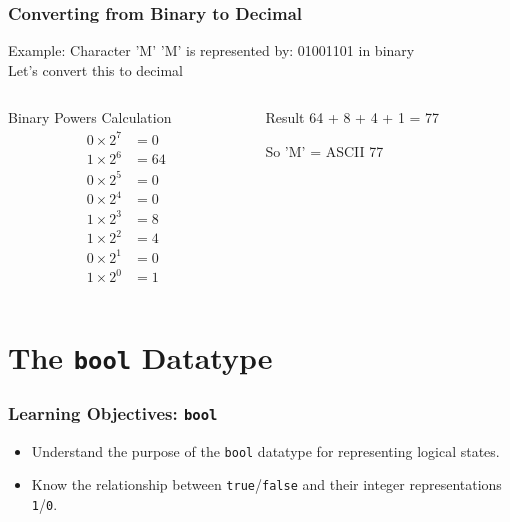 \documentclass{beamer}
\begin{document}
\begin{frame}
\frametitle{Converting from Binary to Decimal}
\begin{alertblock}{Example: Character 'M'}
'M' is represented by: 01001101 in binary\\
Let's convert this to decimal
\end{alertblock}

\begin{columns}[T]
    \begin{column}{0.6\textwidth}
        \begin{block}{Binary Powers Calculation}
        \scriptsize
        \begin{align*}
        0 \times 2^7 &= 0 \\
        1 \times 2^6 &= 64 \\
        0 \times 2^5 &= 0 \\
        0 \times 2^4 &= 0 \\
        1 \times 2^3 &= 8 \\
        1 \times 2^2 &= 4 \\
        0 \times 2^1 &= 0 \\
        1 \times 2^0 &= 1
        \end{align*}
        \end{block}
    \end{column}
    \begin{column}{0.4\textwidth}
        \begin{exampleblock}{Result}
        \Large
        64 + 8 + 4 + 1 = 77
        
        So 'M' = ASCII 77
        \end{exampleblock}
    \end{column}
\end{columns}
\end{frame}


\section{The \texttt{bool} Datatype}

\begin{frame}
\frametitle{Learning Objectives: \texttt{bool}}
\begin{itemize}
    \item Understand the purpose of the \texttt{bool} datatype for representing logical states.\pause
    \item Know the relationship between \texttt{true}/\texttt{false} and their integer representations \texttt{1}/\texttt{0}.
\end{itemize}
\end{frame}
\end{document}
